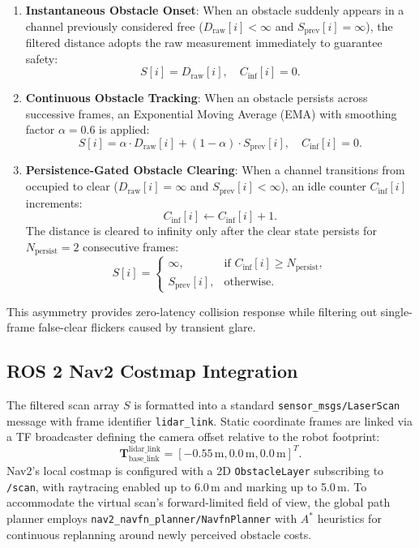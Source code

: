\documentclass[preprint,12pt]{elsarticle}
\begin{document}
\begin{enumerate}
  \item \textbf{Instantaneous Obstacle Onset}: When an obstacle suddenly appears in a channel previously considered free ($D_{\mathrm{raw}}[i] < \infty$ and $S_{\mathrm{prev}}[i] = \infty$), the filtered distance adopts the raw measurement immediately to guarantee safety:
  \begin{equation}
    S[i] = D_{\mathrm{raw}}[i], \quad C_{\mathrm{inf}}[i] = 0.
  \end{equation}
  \item \textbf{Continuous Obstacle Tracking}: When an obstacle persists across successive frames, an Exponential Moving Average (EMA) with smoothing factor $\alpha = 0.6$ is applied:
  \begin{equation}
    S[i] = \alpha \cdot D_{\mathrm{raw}}[i] + (1 - \alpha) \cdot S_{\mathrm{prev}}[i], \quad C_{\mathrm{inf}}[i] = 0.
  \end{equation}
  \item \textbf{Persistence-Gated Obstacle Clearing}: When a channel transitions from occupied to clear ($D_{\mathrm{raw}}[i] = \infty$ and $S_{\mathrm{prev}}[i] < \infty$), an idle counter $C_{\mathrm{inf}}[i]$ increments:
  \begin{equation}
    C_{\mathrm{inf}}[i] \gets C_{\mathrm{inf}}[i] + 1.
  \end{equation}
  The distance is cleared to infinity only after the clear state persists for $N_{\mathrm{persist}} = 2$ consecutive frames:
  \begin{equation}
    S[i] = \begin{cases} \infty, & \text{if } C_{\mathrm{inf}}[i] \ge N_{\mathrm{persist}}, \\ S_{\mathrm{prev}}[i], & \text{otherwise.} \end{cases}
  \end{equation}
\end{enumerate}
This asymmetry provides zero-latency collision response while filtering out single-frame false-clear flickers caused by transient glare.

\subsection{ROS 2 Nav2 Costmap Integration}
The filtered scan array $S$ is formatted into a standard \texttt{sensor\_msgs/}\allowbreak\texttt{LaserScan} message with frame identifier \texttt{lidar\_link}. Static coordinate frames are linked via a TF broadcaster defining the camera offset relative to the robot footprint:
\begin{equation}
  \mathbf{T}_{\mathrm{base\_link}}^{\mathrm{lidar\_link}} = [-0.55\,\text{m}, 0.0\,\text{m}, 0.0\,\text{m}]^T.
\end{equation}
Nav2's local costmap is configured with a 2D \texttt{ObstacleLayer} subscribing to \texttt{/scan}, with raytracing enabled up to 6.0\,m and marking up to 5.0\,m. To accommodate the virtual scan's forward-limited field of view, the global path planner employs \texttt{nav2\_navfn\_planner/}\allowbreak\texttt{NavfnPlanner} with $A^*$ heuristics for continuous replanning around newly perceived obstacle costs.
\end{document}
